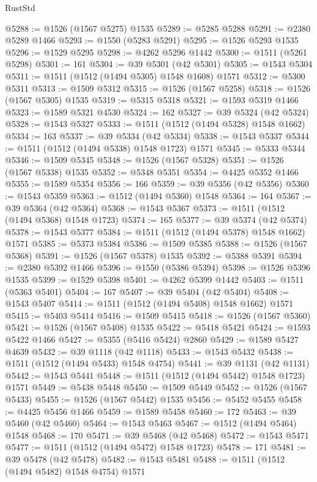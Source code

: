 \begin{lexlean}{RustStd}
\begin{coremodule}
{{@5288 := @1526 (@1567 @5275) @1535
@5289 := @5285 @5288
@5291 := @2380 @5289 @1466
@5293 := @1550 (@5283 @5291)
@5295 := @1526 @5293 @1535
@5296 := @1529 @5295
@5298 := @4262 @5296 @1442
@5300 := @1511 (@5261 @5298)
@5301 := 161
@5304 := @39 @5301 (@42 @5301)
@5305 := @1543 @5304
@5311 := @1511 (@1512 (@1494 @5305) @1548 @1608) @1571
@5312 := @5300 @5311
@5313 := @1509 @5312
@5315 := @1526 (@1567 @5258)
@5318 := @1526 (@1567 @5305) @1535
@5319 := @5315 @5318
@5321 := @1593 @5319 @1466
@5323 := @1589 @5321 @4530
@5324 := 162
@5327 := @39 @5324 (@42 @5324)
@5328 := @1543 @5327
@5333 := @1511 (@1512 (@1494 @5328) @1548 @1662)
@5334 := 163
@5337 := @39 @5334 (@42 @5334)
@5338 := @1543 @5337
@5344 := @1511 (@1512 (@1494 @5338) @1548 @1723) @1571
@5345 := @5333 @5344
@5346 := @1509 @5345
@5348 := @1526 (@1567 @5328)
@5351 := @1526 (@1567 @5338) @1535
@5352 := @5348 @5351
@5354 := @4425 @5352 @1466
@5355 := @1589 @5354
@5356 := 166
@5359 := @39 @5356 (@42 @5356)
@5360 := @1543 @5359
@5363 := @1512 (@1494 @5360) @1548
@5364 := 164
@5367 := @39 @5364 (@42 @5364)
@5368 := @1543 @5367
@5373 := @1511 (@1512 (@1494 @5368) @1548 @1723)
@5374 := 165
@5377 := @39 @5374 (@42 @5374)
@5378 := @1543 @5377
@5384 := @1511 (@1512 (@1494 @5378) @1548 @1662) @1571
@5385 := @5373 @5384
@5386 := @1509 @5385
@5388 := @1526 (@1567 @5368)
@5391 := @1526 (@1567 @5378) @1535
@5392 := @5388 @5391
@5394 := @2380 @5392 @1466
@5396 := @1550 (@5386 @5394)
@5398 := @1526 @5396 @1535
@5399 := @1529 @5398
@5401 := @4262 @5399 @1442
@5403 := @1511 (@5363 @5401)
@5404 := 167
@5407 := @39 @5404 (@42 @5404)
@5408 := @1543 @5407
@5414 := @1511 (@1512 (@1494 @5408) @1548 @1662) @1571
@5415 := @5403 @5414
@5416 := @1509 @5415
@5418 := @1526 (@1567 @5360)
@5421 := @1526 (@1567 @5408) @1535
@5422 := @5418 @5421
@5424 := @1593 @5422 @1466
@5427 := @5355 (@5416 @5424) @2860
@5429 := @1589 @5427 @4639
@5432 := @39 @1118 (@42 @1118)
@5433 := @1543 @5432
@5438 := @1511 (@1512 (@1494 @5433) @1548 @4754)
@5441 := @39 @1131 (@42 @1131)
@5442 := @1543 @5441
@5448 := @1511 (@1512 (@1494 @5442) @1548 @1723) @1571
@5449 := @5438 @5448
@5450 := @1509 @5449
@5452 := @1526 (@1567 @5433)
@5455 := @1526 (@1567 @5442) @1535
@5456 := @5452 @5455
@5458 := @4425 @5456 @1466
@5459 := @1589 @5458
@5460 := 172
@5463 := @39 @5460 (@42 @5460)
@5464 := @1543 @5463
@5467 := @1512 (@1494 @5464) @1548
@5468 := 170
@5471 := @39 @5468 (@42 @5468)
@5472 := @1543 @5471
@5477 := @1511 (@1512 (@1494 @5472) @1548 @1723)
@5478 := 171
@5481 := @39 @5478 (@42 @5478)
@5482 := @1543 @5481
@5488 := @1511 (@1512 (@1494 @5482) @1548 @4754) @1571
}}
\end{coremodule}
\end{lexlean}
